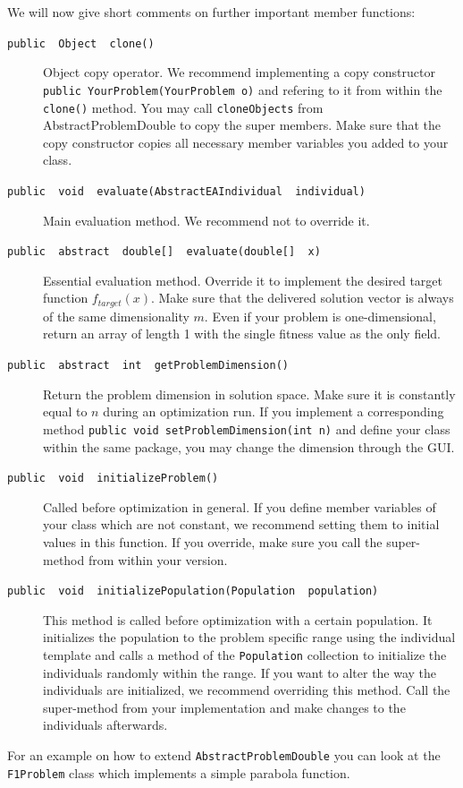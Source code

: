 We will now give short comments on further important member functions:
\begin{description}
\item [{\texttt{public ~Object ~clone()}}] Object copy operator. We recommend
implementing a copy constructor \texttt{public YourProblem(YourProblem
o)} and refering to it from within the \texttt{clone()} method. You
may call \texttt{cloneObjects} from AbstractProblemDouble to copy
the super members. Make sure that the copy constructor copies all
necessary member variables you added to your class.
\item [{\texttt{public ~void ~evaluate(AbstractEAIndividual ~individual)}}] Main
evaluation method. We recommend not to override it.
\item [{\texttt{public ~abstract ~double{[}{]} ~evaluate(double{[}{]} ~x)}}] Essential
evaluation method. Override it to implement the desired target function
$f_{target}(x)$. Make sure that the delivered solution vector is
always of the same dimensionality $m$. Even if your problem is one-dimensional,
return an array of length 1 with the single fitness value as the only
field.
\item [{\texttt{public ~abstract ~int ~getProblemDimension()}}] Return
the problem dimension in solution space. Make sure it is constantly
equal to $n$ during an optimization run. If you implement a corresponding
method \texttt{public void setProblemDimension(int n)} and define
your class within the same package, you may change the dimension through
the GUI.
\item [{\texttt{public ~void ~initializeProblem()}}] Called before optimization
in general. If you define member variables of your class which are
not constant, we recommend setting them to initial values in this
function. If you override, make sure you call the super-method from
within your version.
\item [{\texttt{public ~void ~initializePopulation(Population ~population)}}] This
method is called before optimization with a certain population. It
initializes the population to the problem specific range using the
individual template and calls a method of the \texttt{Population}
collection to initialize the individuals randomly within the range.
If you want to alter the way the individuals are initialized, we recommend
overriding this method. Call the super-method from your implementation
and make changes to the individuals afterwards.
\end{description}
For an example on how to extend \texttt{AbstractProblemDouble} you
can look at the \texttt{F1Problem} class which implements a simple
parabola function.


